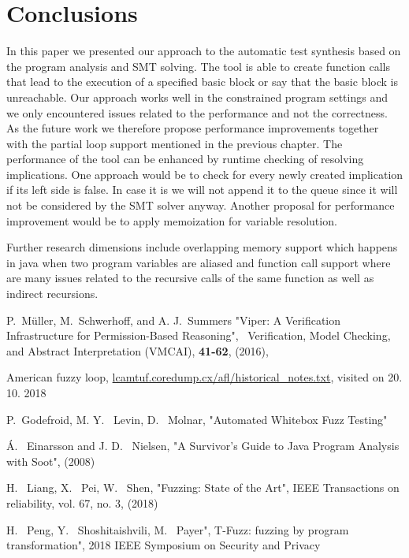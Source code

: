 \documentclass[letterpaper,12pt]{article}
\begin{document}
\section{Conclusions}
In this paper we presented our approach to the automatic test synthesis based on the program analysis and SMT solving. The tool is able to create function calls that lead to the execution of a specified basic block or say that the basic block is unreachable. Our approach works well in the constrained program settings and we only encountered issues related to the performance and not the correctness. As the future work we therefore propose performance improvements together with the partial loop support mentioned in the previous chapter. The performance of the tool can be enhanced by runtime checking of resolving implications. One approach would be to check for every newly created implication if its left side is false. In case it is we will not append it to the queue since it will not be considered by the SMT solver anyway. Another proposal for performance improvement would be to apply memoization for variable resolution. 

Further research dimensions include overlapping memory support which happens in java when two program variables are aliased and function call support where are many issues related to the recursive calls of the same function as well as indirect recursions. 


\begin{thebibliography}{99}

 P.\ M{\"u}ller, M.\ Schwerhoff, and A. J.\ Summers
 "Viper: A Verification Infrastructure for
Permission-Based Reasoning", \
Verification, Model Checking, and Abstract Interpretation (VMCAI), \textbf{41-62}, 
(2016),
 
American fuzzy loop, \url{lcamtuf.coredump.cx/afl/historical_notes.txt}, visited on 20. 10. 2018

P.\ Godefroid, M. Y. \ Levin, D. \ Molnar, "Automated Whitebox Fuzz Testing"

{\'A}. \ Einarsson and J. D. \ Nielsen, "A Survivor’s Guide to Java Program Analysis with Soot", (2008)

H. \ Liang, X. \ Pei, W. \ Shen, "Fuzzing: State of the Art", IEEE Transactions on reliability, vol. 67, no. 3, (2018)

H. \ Peng, Y. \ Shoshitaishvili, M. \ Payer", T-Fuzz: fuzzing by program transformation", 2018 IEEE Symposium on Security and Privacy

\end{thebibliography}
\end{document}
